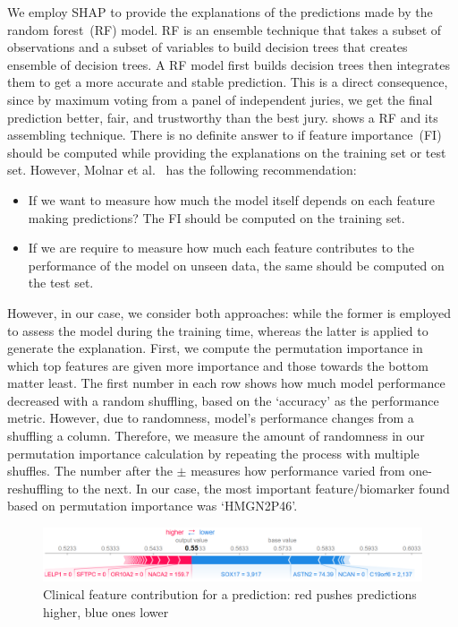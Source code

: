 \hspace*{3.5mm}We employ SHAP to provide the explanations of the predictions made by the random forest~(RF) model. RF is an ensemble technique that takes a subset of observations and a subset of variables to build decision trees that creates ensemble of decision trees. A RF model first builds decision trees then integrates them to get a more accurate and stable prediction. This is a direct consequence, since by maximum voting from a panel of independent juries, we get the final prediction better, fair, and trustworthy than the best jury.  shows a RF and its assembling technique. There is no definite answer to if feature importance~(FI) should be computed while providing the explanations on the training set or test set. However, Molnar et al.~\cite{molnar2019interpretable} has the following recommendation: 

\begin{itemize} [noitemsep]
    \item If we want to measure how much the model itself depends on each feature making predictions? The FI should be computed on the training set.
    \item If we are require to measure how much each feature contributes to the performance of the model on unseen data, the same should be computed on the test set. 
\end{itemize}

\hspace*{3.5mm} However, in our case, we consider both approaches: while the former is employed to assess the model during the training time, whereas the latter is applied to generate the explanation. First, we compute the permutation importance in which top features are given more importance and those towards the bottom matter least.
The first number in each row shows how much model performance decreased with a random shuffling, based on the `accuracy' as the performance metric. 
However, due to randomness, model's performance changes from a shuffling a column. Therefore, we measure the amount of randomness in our permutation importance calculation by repeating the process with multiple shuffles. The number after the $±$ measures how performance varied from one-reshuffling to the next. In our case, the most important feature/biomarker found based on permutation importance was `HMGN2P46'. %

\begin{figure}[h]
\centering
	\includegraphics[scale=0.8]{images/shap.png}
	\caption{Clinical feature contribution for a prediction: red pushes predictions higher, blue ones lower} 
	\label{fig:shap}
	\vspace{-2mm}
\end{figure}

